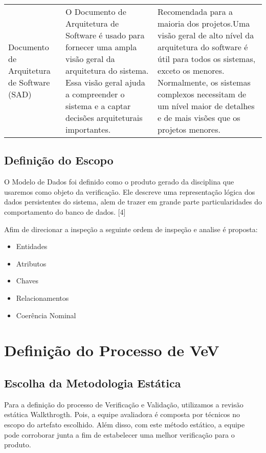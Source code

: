 \begin{table}[]
\begin{tabular}{lll}
Documento de Arquitetura de Software (SAD)         & O Documento de Arquitetura de Software é usado para fornecer uma ampla visão geral da arquitetura do sistema. Essa visão geral ajuda a compreender o sistema e a captar decisões arquiteturais importantes.                                                                                                                                                                                                       & Recomendada para a maioria dos projetos.Uma visão geral de alto nível da arquitetura do software é útil para todos os sistemas, exceto os menores. Normalmente, os sistemas complexos necessitam de um nível maior de detalhes e de mais visões que os projetos menores.                                                                                                        
\end{tabular}
\end{table}

\subsection{Definição do Escopo}
O Modelo de Dados foi definido como o produto gerado da disciplina que usaremos como objeto da verificação. Ele descreve uma representação lógica dos dados persistentes do sistema, alem de trazer em grande parte particularidades do comportamento do banco de dados. [4]

Afim de direcionar a inspeção a seguinte ordem de inspeção e analise é proposta:

\begin{itemize}
\item Entidades
\item Atributos
\item Chaves
\item Relacionamentos
\item Coerência Nominal
\end{itemize}

\section{Definição do Processo de VeV}
\subsection{Escolha da Metodologia Estática}
Para a definição do processo de Verificação e Validação, utilizamos a revisão
estática Walkthrogth. Pois,  a equipe avaliadora é composta por técnicos no escopo
do artefato escolhido. Além disso, com este método estático, a equipe pode corroborar
junta a fim de estabelecer uma melhor verificação para o produto.

